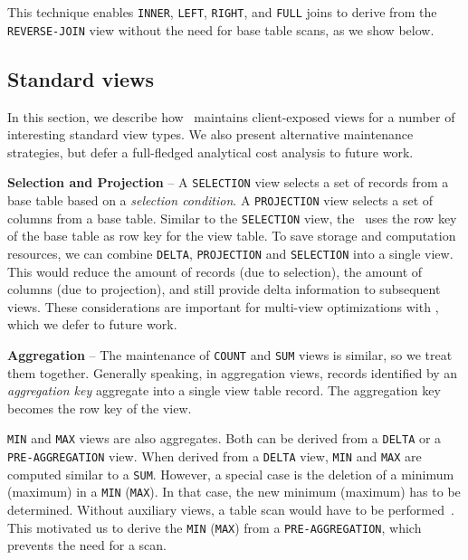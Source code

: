 This technique enables \texttt{INNER}, \texttt{LEFT}, \texttt{RIGHT},
and \texttt{FULL} joins to derive from the \texttt{REVERSE-JOIN} view
without the need for base table scans, as we show below.


\subsection{Standard views}
\label{subsec:common_views}

In this section, we describe how \VMS\ maintains client-exposed views
for a number of interesting standard view types. We also present
alternative maintenance strategies, but defer a full-fledged
analytical cost analysis to future work.

\noindent  
\textbf{Selection and Projection} -- A \texttt{SELECTION} view selects
a set of records from a base table based on a \textit{selection
  condition}. A \texttt{PROJECTION} view selects a set of columns from a base
table. Similar to the \texttt{SELECTION} view, the \VM\ uses the row
key of the base table as row key for the view table. To save storage and 
computation resources, we can combine \texttt{DELTA}, \texttt{PROJECTION} and
\texttt{SELECTION} into a single view. This would reduce the amount of
records (due to selection), the amount of columns (due to projection),
and still provide delta information to subsequent views. These
considerations are important for multi-view optimizations with \VMS,
which we defer to future work.

\noindent  
\textbf{Aggregation} -- The maintenance of \texttt{COUNT} and
\texttt{SUM} views is similar, so we treat them together.
Generally speaking, in aggregation views, records identified by an
\textit{aggregation key} aggregate into a single view table record.
The aggregation key becomes the row key of the view. 

\texttt{MIN} and \texttt{MAX} views are
also aggregates. Both can be derived from a \texttt{DELTA} or a
\texttt{PRE-AGGREGATION} view. When derived from a \texttt{DELTA}
view, \texttt{MIN} and \texttt{MAX} are computed similar to a
\texttt{SUM}. However, a special case is the deletion of a minimum
(maximum) in a \texttt{MIN} (\texttt{MAX}). In that case, the new
minimum (maximum) has to be determined. Without auxiliary views, a
table scan would have to be
performed~\cite{jacobsen:viewmaintenance}. This motivated us to derive
the \texttt{MIN} (\texttt{MAX}) from a \texttt{PRE-AGGREGATION}, which
prevents the need for a scan.

